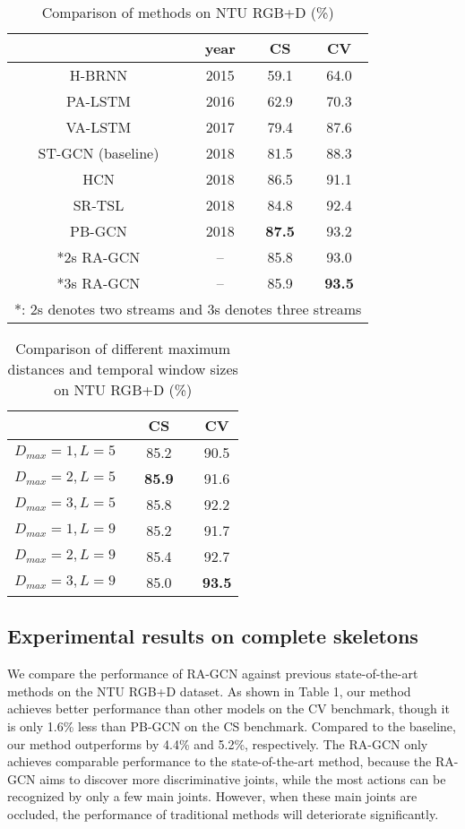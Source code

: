 \documentclass{article}
\begin{document}
\begin{table}
\label{tab:1}
\caption{Comparison of methods on NTU RGB+D (\%)}
\centering
\begin{tabular}{cccc}
\hline
& year & CS & CV \\
\hline
H-BRNN \cite{Du2015} & 2015 & 59.1 & 64.0 \\
PA-LSTM \cite{Shahroudy2016} & 2016 & 62.9 & 70.3 \\
VA-LSTM \cite{Zhang2017b} & 2017 & 79.4 & 87.6 \\
ST-GCN (baseline) \cite{Yan2018} & 2018 & 81.5 & 88.3 \\
HCN \cite{Li2018} & 2018 & 86.5 & 91.1 \\
SR-TSL \cite{Si2018} & 2018 & 84.8 & 92.4 \\
PB-GCN \cite{Thakkar2018} & 2018 & {\bf 87.5} & 93.2 \\
\hline
*2s RA-GCN & -- & 85.8 & 93.0 \\
*3s RA-GCN & -- & 85.9 & {\bf 93.5} \\
\hline
\multicolumn{4}{l}{*: 2s denotes two streams and 3s denotes three streams}
\end{tabular}
\end{table}

\begin{table}
\label{tab:2}
\caption{Comparison of different maximum distances and temporal window sizes on NTU RGB+D (\%)}
\centering
\begin{tabular}{ccccc}
\hline
& & CS &  & CV \\
\hline
$D_{max}=1, L=5$&  & 85.2 & &  90.5 \\
$D_{max}=2, L=5$&  & {\bf 85.9} & & 91.6 \\
$D_{max}=3, L=5$&  & 85.8 & & 92.2 \\
$D_{max}=1, L=9$&  & 85.2 & & 91.7 \\
$D_{max}=2, L=9$&  & 85.4 & & 92.7 \\
$D_{max}=3, L=9$&  & 85.0 & & {\bf 93.5} \\
\hline
\end{tabular}
\end{table}

\subsection{Experimental results on complete skeletons}
\label{ssec:results}

We compare the performance of RA-GCN against previous state-of-the-art methods on the NTU RGB+D dataset. As shown in Table 1, our method achieves better performance than other models on the CV benchmark, though it is only 1.6\% less than PB-GCN \cite{Thakkar2018} on the CS benchmark. Compared to the baseline, our method outperforms by 4.4\% and 5.2\%, respectively. The RA-GCN only achieves comparable performance to the state-of-the-art method, because the RA-GCN aims to discover more discriminative joints, while the most actions can be recognized by only a few main joints. However, when these main joints are occluded, the performance of traditional methods will deteriorate significantly.
\end{document}
